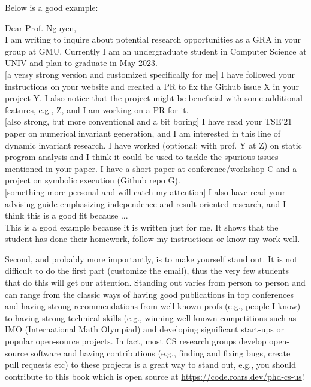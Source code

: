 \documentclass[oneside,11pt]{book}
\newenvironment{examplebox}[1][]{
  \small
  \begin{marker}[\faChessBishop{}]
    {\textbf{#1}}
  }{
  \end{marker}
}
\begin{document}
Below is a good example:

\begin{examplebox}

Dear Prof. Nguyen,\\

  I am writing to inquire about potential research opportunities as a GRA in your group at GMU. Currently I am an undergraduate student in Computer Science at UNIV and plan to graduate in May 2023.
    \\

  [a versy strong version and customized specifically for me] I have followed your instructions on your website and created a PR to fix the Github issue X in your project Y. I also notice that the project might be beneficial with some additional features, e.g., Z, and I am working on a PR for it.\\

  [also strong, but more conventional and a bit boring] I have read your TSE'21 paper on numerical invariant generation, and I am interested in this line of dynamic invariant research. I have worked (optional: with prof. Y at Z) on static program analysis and I think it could be used to tackle the spurious issues mentioned in your paper. I have a short paper at conference/workshop C and a project on symbolic execution (Github repo G).\\


  [something more personal and will catch my attention] I also have read your advising guide emphasizing independence and result-oriented research, and I think this is a good fit because ...\\

 \tcblower
  This is a good example because it is written just for me.  It shows that the student has done their homework, follow my instructions or know my work well.
\end{examplebox}

Second, and probably more importantly, is to make yourself stand out. It is not difficult to do the first part (customize the email), thus the very few students that do this will get our attention.   Standing out varies from person to person and can range from the classic ways of having good publications in top conferences and having strong recommendations from well-known profs (e.g., people I know) to having strong technical skills (e.g., winning well-known competitions such as IMO (International Math Olympiad) and developing significant start-ups or popular open-source projects. In fact, most CS research groups develop open-source software and having contributions (e.g., finding and fixing bugs, create pull requests etc) to these projects is a great way to stand out, e.g., you should contribute to this book which is open source at \url{https://code.roars.dev/phd-cs-us}! 
\end{document}
